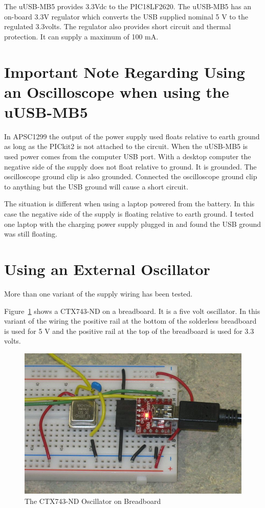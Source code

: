 \documentclass[twocolumn]{article}
\makeatletter
\def\maxwidth{\ifdim\Gin@nat@width>\linewidth\linewidth
\else\Gin@nat@width\fi}
\let\Oldincludegraphics\includegraphics
\renewcommand{\includegraphics}[1]{\Oldincludegraphics[width=\maxwidth]{#1}}
\makeatother
\begin{document}
The uUSB-MB5 provides 3.3Vdc to the PIC18LF2620. The uUSB-MB5 has an
on-board 3.3V regulator which converts the USB supplied nominal 5 V to
the regulated 3.3volts. The regulator also provides short circuit and
thermal protection. It can supply a maximum of 100 mA.

\section{Important Note Regarding Using an Oscilloscope when using
the uUSB-MB5}

In APSC1299 the output of the power supply used floats relative to earth
ground as long as the PICkit2 is not attached to the circuit. When the
uUSB-MB5 is used power comes from the computer USB port. With a desktop
computer the negative side of the supply does not float relative to
ground. It is grounded. The oscilloscope ground clip is also grounded.
Connected the oscilloscope ground clip to anything but the USB ground
will cause a short circuit.

The situation is different when using a laptop powered from the battery.
In this case the negative side of the supply is floating relative to
earth ground. I tested one laptop with the charging power supply plugged
in and found the USB ground was still floating.

\section{Using an External Oscillator}

More than one variant of the supply wiring has been tested.

Figure~\ref{osc8mhz} shows a CTX743-ND on a breadboard. It is a five volt oscillator. In this variant of the wiring the
positive rail at the bottom of the solderless breadboard is used for 5 V
and the positive rail at the top of the breadboard is used for 3.3
volts.

\begin{figure}[htbp]
\centering
\includegraphics{phys1600/usb-mb5_8mhzosc.jpg}
\caption{The CTX743-ND Oscillator on Breadboard}
\label{osc8mhz}
\end{figure}
\end{document}
